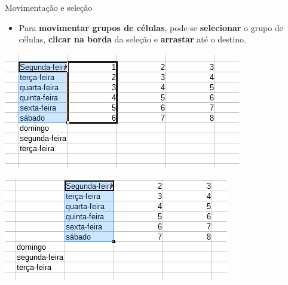 \begin{frame}{Movimentação e seleção}
	\begin{block}{}
		\begin{itemize}
			\item Para \textbf{movimentar grupos de células}, pode-se \textbf{selecionar} o grupo de células, \textbf{clicar na borda} da seleção e \textbf{arrastar} até o destino.
		\end{itemize}
	\end{block}
	
	\bigskip
	
	\begin{minipage}{0.49\linewidth}
		\centering
		\includegraphics[width=1\linewidth]{Figuras/Ch06/fig17}
	\end{minipage}\hfill
	\begin{minipage}{0.49\linewidth}
		\centering
		\includegraphics[width=1\linewidth]{Figuras/Ch06/fig18}
	\end{minipage}
\end{frame}


